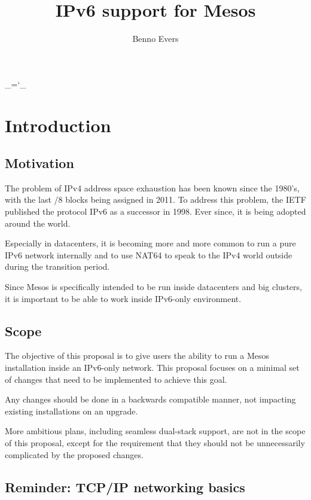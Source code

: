 \documentclass{scrreprt}
\begin{document}
\title{IPv6 support for Mesos}
\author{Benno Evers}

\chardef\_=`_

\maketitle

\tableofcontents

\chapter{Introduction}

\section{Motivation}
The problem of IPv4 address space exhaustion has been known since the 1980's,
with the last /8 blocks being assigned in 2011.
To address this problem, the IETF published the protocol IPv6 as a successor in 1998.
Ever since, it is being adopted around the world.

Especially in datacenters, it is becoming more and more common to run a pure IPv6
network internally and to use NAT64 to speak to the IPv4 world outside during the
transition period.

Since Mesos is specifically intended to be run inside datacenters and big
clusters, it is important to be able to work inside IPv6-only environment.


\section{Scope}
The objective of this proposal is to give users the ability to run a
Mesos installation inside an IPv6-only network.
This proposal focuses on a minimal set of changes that need to be implemented
to achieve this goal.

Any changes should be done in a backwards compatible manner, not impacting
existing installations on an upgrade.

More ambitious plans, including seamless dual-stack support, are not in the
scope of this proposal, except for the requirement that they should not be
unnecessarily complicated by the proposed changes.


\section{Reminder: TCP/IP networking basics}
\end{document}
